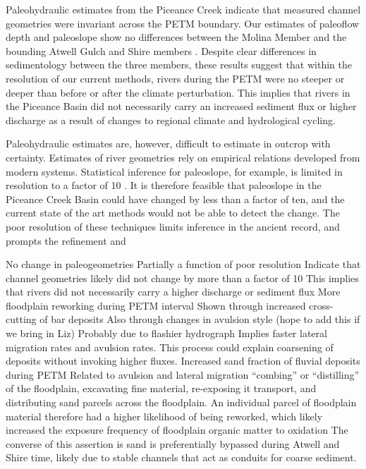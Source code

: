 \documentclass[draft]{compact_proposal}
\begin{document}
Paleohydraulic estimates from the Piceance Creek indicate that measured channel geometries were invariant across the PETM boundary.
Our estimates of paleoflow depth and paleoslope show no differences between the Molina Member and the bounding Atwell Gulch and Shire members .
Despite clear differences in sedimentology between the three members, these results suggest that within the resolution of our current methods, rivers during the PETM were no steeper or deeper than before or after the climate perturbation.
This implies that rivers in the Piceance Basin did not necessarily carry an increased sediment flux or higher discharge as a result of changes to regional climate and hydrological cycling.

Paleohydraulic estimates are, however, difficult to estimate in outcrop with certainty. Estimates of river geometries rely on empirical relations developed from modern systems.
Statistical inference for paleoslope, for example, is limited in resolution to a factor of 10 \cnote.
It is therefore feasible that paleoslope in the Piceance Creek Basin could have changed by less than a factor of ten, and the current state of the art methods would not be able to detect the change.
The poor resolution of these techniques limits inference in the ancient record, and prompts the refinement and 

No change in paleogeometries
  Partially a function of poor resolution
  Indicate that channel geometries likely did not change by more than a factor of 10
  This implies that rivers did not necessarily carry a higher discharge or sediment flux
More floodplain reworking during PETM interval
  Shown through increased cross-cutting of bar deposits
  Also through changes in avulsion style (hope to add this if we bring in Liz)
  Probably due to flashier hydrograph
  Implies faster lateral migration rates and avulsion rates.
  This process could explain coarsening of deposits without invoking higher fluxes.
Increased sand fraction of fluvial deposits during PETM
  Related to avulsion and lateral migration “combing” or “distilling” of the floodplain, excavating fine material, re-exposing it transport, and distributing sand parcels across the floodplain.
  An individual parcel of floodplain material therefore had a higher likelihood of being reworked, which likely increased the exposure frequency of floodplain organic matter to oxidation
  The converse of this assertion is sand is preferentially bypassed during Atwell and Shire time, likely due to stable channels that act as conduits for coarse sediment.
\end{document}

